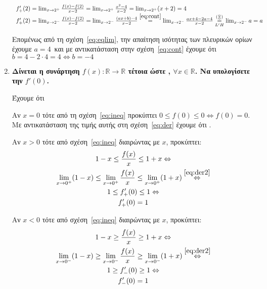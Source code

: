 \begin{enumerate}
\begin{solution}
		\[
			\begin{tabular}{l}
			$f_{+}'(2) = \lim_{x\to 2^{+}} \frac{f(x) - f(2)}{x - 2} =
			\lim_{x\to 2^{+}} \frac{x^{2} - 4}{x - 2} = \lim_{x\to 2^{+}} (x+2)
			= 4$ \\
			$f_{+}'(2) = \lim_{x\to 2^{-}} \frac{f(x)- f(2)}{x-2} = \lim_{x\to
			2^{-}} \frac{(ax+b) - 4}{x - 2}\overset{\eqref{eq:cont}}{=} \lim_{x\to 2^{-}}
				\frac{ax+4 - 2a - 4}{x - 2}
				\overset{(\frac{0}{0})}{\underset{L'H}{=}} \lim_{x\to 2^{-}} a = a$
			\end{tabular}
		\]
		
		Επομένως από τη σχέση~\eqref{eq:eqlim}, την απαίτηση ισότητας των
		πλευρικών ορίων έχουμε $ a = 4 $ και με αντικατάσταση στην
		σχέση~\eqref{eq:cont} έχουμε ότι $ b = 4 - 2\cdot 4 = 4 \Leftrightarrow
		b = -4$ 
  \end{solution}

	\item {\bfseries \boldmath Δίνεται η συνάρτηση $ f(x) \colon \mathbb{R} \to \mathbb{R} $ τέτοια
		ώστε , 
	$ \forall x \in \mathbb{R} $. Να υπολογίσετε την $ f'(0) $.}


  \begin{solution}
		
		Έχουμε ότι  

		Αν $ x=0 $ τότε από τη σχέση~\eqref{eq:ineq} προκύπτει $ 0 \leq f(0) \leq 0
		\Leftrightarrow f(0) = 0$. Με αντικατάσταση της τιμής αυτής στη
		σχέση~\eqref{eq:der} έχουμε ότι .
		
		\begin{minipage}{0.45\textwidth}
		Αν $ x>0 $ τότε από σχέση~\eqref{eq:ineq} διαιρώντας με $x$, προκύπτει:
		\begin{gather*}
			1-x \leq \frac{f(x)}{x} \leq 1+x \Leftrightarrow \\ 
			\lim_{x\to 0^{+}}(1-x) \leq \lim_{x\to 0^{+}} \frac{f(x)}{x}
			\leq \lim_{x\to 0^{+}} (1+x)\overset{\eqref{eq:der2}}\Leftrightarrow
			\\
			1 \leq f_{+}'(0) \leq 1 \Leftrightarrow \\
			f_{+}'(0) = 1
		\end{gather*}
		\end{minipage} \hfill 
		\begin{minipage}{0.45\textwidth}
		Αν $ x<0 $ τότε από σχέση~\eqref{eq:ineq} διαιρώντας με $x$, προκύπτει:
			\begin{gather*}
			1-x \geq \frac{f(x)}{x} \geq 1+x \Leftrightarrow \\ 
			\lim_{x\to 0^{-}}(1-x) \geq \lim_{x\to 0^{-}} \frac{f(x)}{x}
			\geq \lim_{x\to 0^{-}} (1+x)\overset{\eqref{eq:der2}}\Leftrightarrow
			\\
			1 \geq f_{-}'(0) \geq 1 \Leftrightarrow \\
			f_{-}'(0) = 1
			\end{gather*}
		\end{minipage} 


\end{solution}
\end{enumerate}
